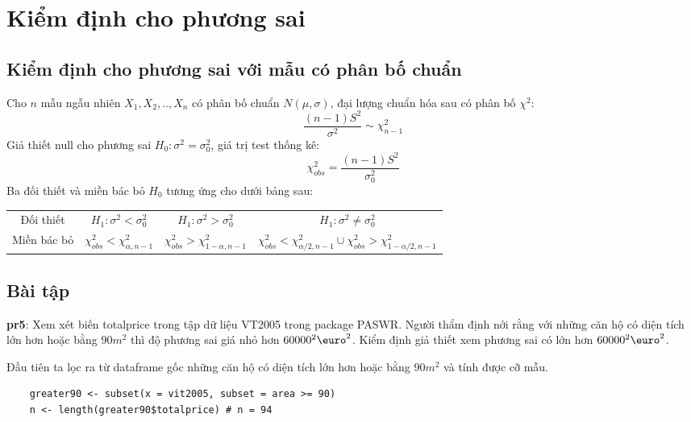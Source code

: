 \chapter{Kiểm định cho phương sai}

\section{Kiểm định cho phương sai với mẫu có phân bố chuẩn}

Cho $n$ mẫu ngẫu nhiên $X_1, X_2, .. , X_n$ có phân bố chuẩn $N(\mu, \sigma)$, 
đại lượng chuẩn hóa sau có phân bố $\chi^2$:
\begin{equation}
    \frac{(n - 1)S^2}{\sigma^2} \sim \chi^2_{n - 1}
\end{equation}
Giả thiết null cho phương sai $H_0: \sigma^2 = \sigma_0^2$, giá trị test thống kê:
$$\chi_{obs}^2 = \frac{(n - 1)S^2}{\sigma_0^2}$$
Ba đối thiết và miền bác bỏ $H_0$ tương ứng cho dưới bảng sau:

\begin{center}
    \begin{tabular}{| c | c | c | c |}
        \hline
        Đối thiết & $H_1: \sigma^2 < \sigma_0^2$ & $H_1: \sigma^2 > \sigma_0^2$ & $H_1: \sigma^2 \neq \sigma_0^2$ \\
        Miền bác bỏ & $\chi_{obs}^2 < \chi_{\alpha, n - 1}^2$ & $\chi_{obs}^2 > \chi_{1 - \alpha, n - 1}^2$ & $\chi_{obs}^2 < \chi_{\alpha/2, n - 1}^2 \cup \chi_{obs}^2 > \chi_{1 - \alpha/2, n - 1}^2$ \\
        \hline
    \end{tabular}
\end{center}

\section{Bài tập}

\textbf{pr5}: Xem xét biến totalprice trong tập dữ liệu VT2005 trong package PASWR. Người thẩm định nới rằng với những
căn hộ có diện tích lớn hơn hoặc bằng $90m^2$ thì độ phương sai giá nhỏ hơn $60000^2\text{\euro}^2$.
Kiểm định giả thiết xem phương sai có lớn hơn $60000^2\text{\euro}^2$. 

Đầu tiên ta lọc ra từ dataframe gốc những căn hộ có diện tích lớn hơn hoặc bằng $90m^2$ 
và tính được cỡ mẫu.

\begin{lstlisting}
    greater90 <- subset(x = vit2005, subset = area >= 90)
    n <- length(greater90$totalprice) # n = 94
\end{lstlisting}

